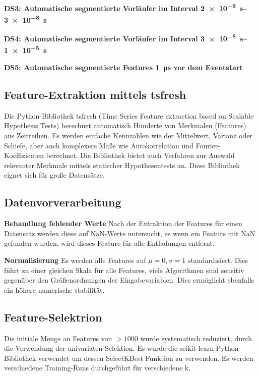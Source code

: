 \textbf{DS3: Automatische segmentierte Vorläufer im Interval \SIrange{2e-9}{3e-8}{\second}}

\textbf{DS4: Automatische segmentierte Vorläufer im Interval \SIrange{3e-8}{1e-5}{\second}}

\textbf{DS5: Automatische segmentierte Features \SI{1}{\micro\second} vor dem Eventstart}


\subsection{Feature-Extraktion mittels tsfresh}
Die Python-Bibliothek tsfresh (Time Series Feature extraction based on Scalable Hypothesis Tests) berechnet automatisch Hunderte von Merkmalen (Features) aus Zeitreihen. Es werden einfache Kennzahlen wie der Mittelwert, Varianz oder Schiefe, aber auch komplexere Maße wie Autokorrelation und Fourier-Koeffizienten berechnet. Die Bibliothek bietet auch Verfahren zur Auswahl relevanter Merkmale mittels statischer Hypothesentests an. Diese Bibliothek eignet sich für große Datensätze.


\subsection{Datenvorverarbeitung}

\textbf{Behandlung fehlender Werte}\newline
Nach der Extraktion der Features für einen Datensatz werden diese auf NaN-Werte untersucht, es wenn ein Feature mit NaN gefunden wurden, wird dieses Feature für alle Entladungen entfernt.

\textbf{Normalisierung}\newline
Es werden alle Features auf \(\mu = 0, \sigma = 1\) standardisiert. Dies führt zu einer gleichen Skala für alle Features, viele Algorithmen sind sensitiv gegenüber den Größenordnungen der Eingabevariablen. Dies ermöglicht ebenfalls ein höhere numerische stabilität.

\subsection{Feature-Selektrion}

Die initiale Menge an Features von \(> 1000\) wurde systematisch reduziert, durch die Verwendung der univariaten Selektion. Es wurde die scikit-learn Python-Bibliothek verwendet um dessen SelectKBest Funktion zu verwenden. Es werden verschiedene Training-Runs durchgeführt für verschiedene k.%


